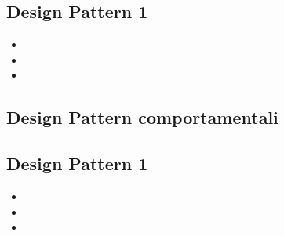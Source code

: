 \subsection{Design Pattern 1} %
\begin{itemize}
\item {} 
\item {} 
\item {}
\end{itemize}

\subsection{Design Pattern comportamentali} %
\subsection{Design Pattern 1} %
\begin{itemize}
\item {} 
\item {} 
\item {}
\end{itemize}

